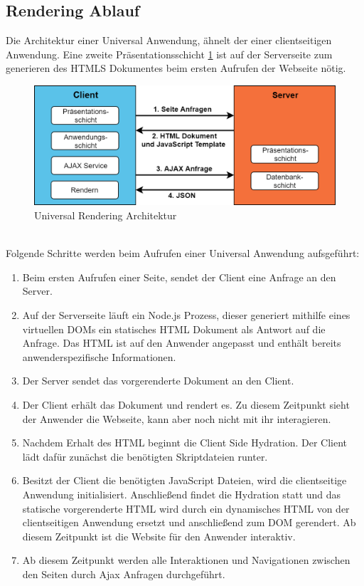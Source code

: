 \documentclass[runningheads]{llncs}
\begin{document}
\subsection{Rendering Ablauf}
\label{subsec:Rendering Ablauf}
Die Architektur einer Universal Anwendung, ähnelt der einer clientseitigen Anwendung. Eine
zweite Präsentationsschicht \ref{Universal Rendering Architektur} ist auf der Serverseite zum generieren des HTMLS Dokumentes beim
ersten Aufrufen der Webseite nötig.
\begin{figure}[h]
  \centering
  \includegraphics[width=12cm]{images/universal}
  \caption{Universal Rendering Architektur}
  \label{Universal Rendering Architektur}
\end{figure}
\\
Folgende Schritte werden beim Aufrufen einer Universal Anwendung aufsgeführt:
\begin{enumerate}
  \setlength\itemsep{1em}
  \item Beim ersten Aufrufen einer Seite, sendet der Client eine Anfrage an den Server.
  \item Auf der Serverseite läuft ein Node.js Prozess, 
  dieser generiert mithilfe eines virtuellen DOMs 
  ein statisches HTML Dokument als Antwort auf die Anfrage. 
  Das HTML ist auf den Anwender angepasst und enthält bereits anwenderspezifische Informationen.
  \item Der Server sendet das vorgerenderte Dokument an den Client.
  \item Der Client erhält das Dokument und rendert es. 
  Zu diesem Zeitpunkt sieht der Anwender die Webseite, 
  kann aber noch nicht mit ihr interagieren.
  \item Nachdem Erhalt des HTML beginnt die Client Side Hydration. 
  Der Client lädt dafür zunächst die benötigten Skriptdateien runter.
  \item Besitzt der Client die benötigten JavaScript Dateien, 
  wird die clientseitige Anwendung initialisiert. 
  Anschließend findet die Hydration statt und 
  das statische vorgerenderte HTML wird 
  durch ein dynamisches HTML von der clientseitigen Anwendung ersetzt und 
  anschließend zum DOM gerendert. 
  Ab diesem Zeitpunkt ist die Website für den Anwender interaktiv.
  \item Ab diesem Zeitpunkt werden alle Interaktionen und 
  Navigationen zwischen den Seiten durch Ajax Anfragen durchgeführt.
\end{enumerate}
\newpage
\end{document}
